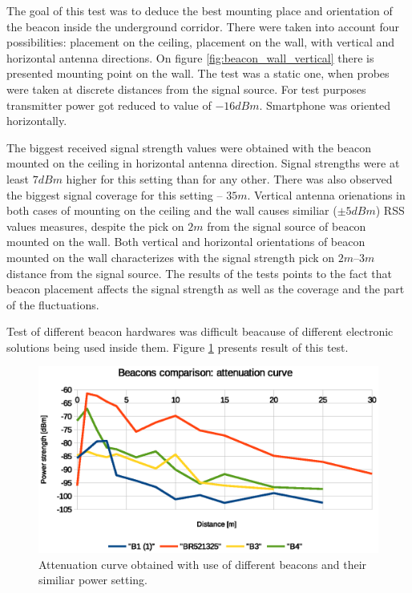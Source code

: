 \documentclass[../main.tex]{subfiles}
\begin{document}
The goal of this test was to deduce the best mounting place and orientation of the beacon inside the underground corridor. There were taken into account four possibilities: placement on the ceiling, placement on the wall, with vertical and horizontal antenna directions. On figure \ref{fig:beacon_wall_vertical} there is presented mounting point on the wall. The test was a static one, when probes were taken at discrete distances from the signal source. For test purposes transmitter power got reduced to value of $-16dBm$. Smartphone was oriented horizontally.

The biggest received signal strength values were obtained with the beacon mounted on the ceiling in horizontal antenna direction. Signal strengths were at least $7dBm$ higher for this setting than for any other. There was also observed the biggest signal coverage for this setting -- $35m$. Vertical antenna orienations in both cases of mounting on the ceiling and the wall causes similiar ($\pm5dBm$) RSS values measures, despite the pick on $2m$ from the signal source of beacon mounted on the wall. Both vertical and horizontal orientations of beacon mounted on the wall characterizes with the signal strength pick on $2m$--$3m$ distance from the signal source. The results of the tests points to the fact that beacon placement affects the signal strength as well as the coverage and the part of the fluctuations.

Test of different beacon hardwares was difficult beacause of different electronic solutions being used inside them. Figure \ref{fig:tests_case8_beacons_comparison} presents result of this test.

\begin{figure}[!htbp]
\includegraphics[width=\textwidth, keepaspectratio]{pictures/tests_case8_beacons_comparison}
\centering
\caption{Attenuation curve obtained with use of different beacons and their similiar power setting.}
\label{fig:tests_case8_beacons_comparison}
\end{figure}
\end{document}
